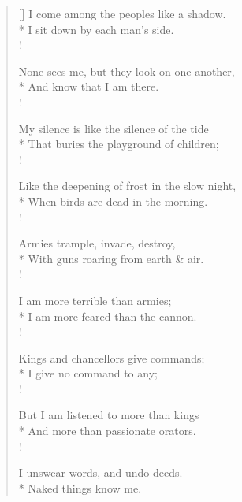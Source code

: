 \documentclass[MAIN]{subfiles}
\begin{document}
\settowidth{\versewidth}{I come among the peoples like a shadow.}
\begin{verse}[\versewidth]
I come among the peoples like a shadow.\\*
I sit down by each man's side.\\!

None sees me, but they look on one another,\\*
And know that I am there.\\!

My silence is like the silence of the tide\\*
That buries the playground of children;\\!

Like the deepening of frost in the slow night,\\*
When birds are dead in the morning.\\!

Armies trample, invade, destroy,\\*
With guns roaring from earth \& air.\\!

I am more terrible than armies;\\*
I am more feared than the cannon.\\!

Kings and chancellors give commands;\\*
I give no command to any;\\!

But I am listened to more than kings\\*
And more than passionate orators.\\!

I unswear words, and undo deeds.\\*
Naked things know me.
\end{verse}
\end{document}
